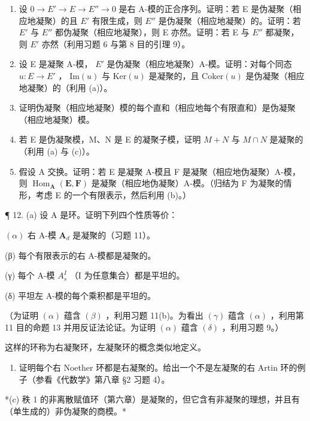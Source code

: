 \begin{enumerate}
\def\labelenumi{(\alph{enumi})}
\item
设 \(0 \to E' \to E \to E'' \to 0\) 是右 A-模的正合序列。证明：若 E 是伪凝聚（相应地凝聚）的且 \(E'\) 有限生成，则 \(E''\) 是伪凝聚（相应地凝聚）的。证明：若 \(E'\) 与 \(E''\) 都伪凝聚（相应地凝聚），则 E 亦然。证明：若 E 与 \(E''\) 都凝聚，则 \(E'\) 亦然（利用习题 6 与第 8 目的引理 9）。
\item
设 E 是凝聚 A-模， \(E'\) 是伪凝聚（相应地凝聚）A-模。证明：对每个同态 \(u: E \to E'\) ， \(\text{Im}(u)\) 与 \(\text{Ker}(u)\) 是凝聚的，且 \(\text{Coker}(u)\) 是伪凝聚（相应地凝聚）的（利用 (a)）。
\item
证明伪凝聚（相应地凝聚）模的每个直和（相应地每个有限直和）是伪凝聚（相应地凝聚）模。
\item
若 E 是伪凝聚模，M、N 是 E 的凝聚子模，证明 \(M + N\) 与 \(M \cap N\) 是凝聚的（利用 (a) 与 (c)）。
\item
假设 A 交换。证明：若 E 是凝聚 A-模且 F 是凝聚（相应地伪凝聚）A-模，则 \(\operatorname{Hom}_{\mathbf{A}}(\mathbf{E}, \mathbf{F})\) 是凝聚（相应地伪凝聚）A-模。（归结为 F 为凝聚的情形，考虑 E 的一个有限表示，然后利用 (b)。）
\end{enumerate}

¶ 12. (a) 设 A 是环。证明下列四个性质等价：

\((\alpha)\) 右 A-模 \(\mathbf{A}_d\) 是凝聚的（习题 11）。

(β) 每个有限表示的右 A-模都是凝聚的。

(γ) 每个 A-模 \(A_{s}^{I}\) （I 为任意集合）都是平坦的。

(δ) 平坦左 A-模的每个乘积都是平坦的。

（为证明 \((\alpha)\) 蕴含 \((\beta)\) ，利用习题 11(b)。为看出 \((\gamma)\) 蕴含 \((\alpha)\) ，利用第 11 目的命题 13 并用反证法论证。为证明 \((\alpha)\) 蕴含 \((\delta)\) ，利用习题 9。）

这样的环称为右凝聚环，左凝聚环的概念类似地定义。

\begin{enumerate}
\def\labelenumi{(\alph{enumi})}
\setcounter{enumi}{1}
\tightlist
\item
  证明每个右 Noether 环都是右凝聚的。给出一个不是左凝聚的右 Artin 环的例子（参看《代数学》第八章 §2 习题 4）。
\end{enumerate}

*(c) 秩 1 的非离散赋值环（第六章）是凝聚的，但它含有非凝聚的理想，并且有（单生成的）非伪凝聚的商模。*

